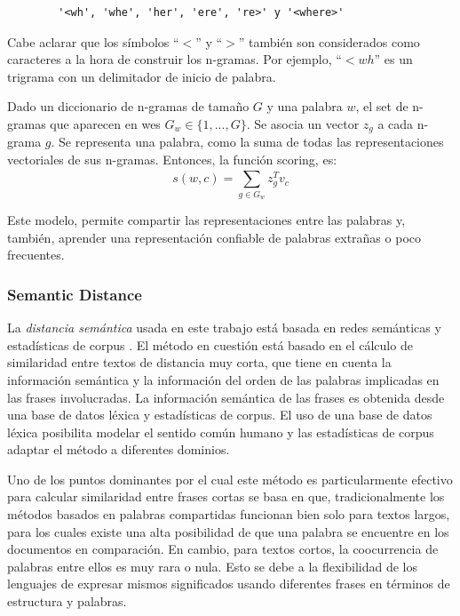 \begin{center}\ttfamily{}%
	\begin{minipage}{45\wd0}%
		\begin{verbatim}
		'<wh', 'whe', 'her', 'ere', 're>' y '<where>'
		\end{verbatim}
	\end{minipage}
\end{center}

Cabe aclarar que los símbolos ``\(<\)'' y ``\(>\)'' también son considerados como caracteres a la hora de construir los n-gramas. Por ejemplo, ``\(<wh\)'' es un trigrama con un delimitador de inicio de palabra.

\bigskip Dado un diccionario de n-gramas de tamaño \(G\) y una palabra \(w\), el set de n-gramas que aparecen en wes \(G_w \in \{1,..., G\}\). Se asocia un vector \(z_g\) a cada n-grama \(g\). Se representa una palabra, como la suma de todas las representaciones vectoriales de sus n-gramas. Entonces, la función scoring, es:
\[s(w,c) = \sum_{g \in G_w}^{}{}z_g^T v_c\]

Este modelo, permite compartir las representaciones entre las palabras y, también, aprender una representación confiable de palabras extrañas o poco frecuentes.

\subsubsection{Semantic Distance}
La \textit{distancia semántica} usada en este trabajo está basada en redes semánticas y estadísticas de corpus \citep{li2006sentence}. El método en cuestión está basado en el cálculo de similaridad entre textos de distancia muy corta, que tiene en cuenta la información semántica y la información del orden de las palabras implicadas en las frases involucradas. La información semántica de las frases es obtenida desde una base de datos léxica y estadísticas de corpus. El uso de una base de datos léxica posibilita modelar el sentido común humano y las estadísticas de corpus adaptar el método a diferentes dominios.

\bigskip Uno de los puntos dominantes por el cual este método es particularmente efectivo para calcular similaridad entre frases cortas se basa en que, tradicionalmente los métodos basados en palabras compartidas funcionan bien solo para textos largos, para los cuales existe una alta posibilidad de que una palabra se encuentre en los documentos en comparación. En cambio, para textos cortos, la coocurrencia de palabras entre ellos es muy rara o nula. Esto se debe a la flexibilidad de los lenguajes de expresar mismos significados usando diferentes frases en términos de estructura y palabras.

